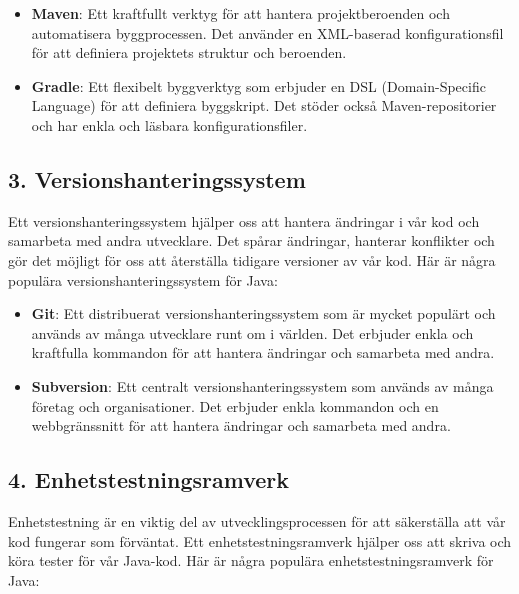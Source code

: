 \begin{itemize}
\tightlist
\item
  \textbf{Maven}: Ett kraftfullt verktyg för att hantera
  projektberoenden och automatisera byggprocessen. Det använder en
  XML-baserad konfigurationsfil för att definiera projektets struktur
  och beroenden.
\item
  \textbf{Gradle}: Ett flexibelt byggverktyg som erbjuder en DSL
  (Domain-Specific Language) för att definiera byggskript. Det stöder
  också Maven-repositorier och har enkla och läsbara
  konfigurationsfiler.
\end{itemize}

\hypertarget{versionshanteringssystem}{%
\subsection{3.
Versionshanteringssystem}\label{versionshanteringssystem}}

Ett versionshanteringssystem hjälper oss att hantera ändringar i vår kod
och samarbeta med andra utvecklare. Det spårar ändringar, hanterar
konflikter och gör det möjligt för oss att återställa tidigare versioner
av vår kod. Här är några populära versionshanteringssystem för Java:

\begin{itemize}
\tightlist
\item
  \textbf{Git}: Ett distribuerat versionshanteringssystem som är mycket
  populärt och används av många utvecklare runt om i världen. Det
  erbjuder enkla och kraftfulla kommandon för att hantera ändringar och
  samarbeta med andra.
\item
  \textbf{Subversion}: Ett centralt versionshanteringssystem som används
  av många företag och organisationer. Det erbjuder enkla kommandon och
  en webbgränssnitt för att hantera ändringar och samarbeta med andra.
\end{itemize}

\hypertarget{enhetstestningsramverk}{%
\subsection{4. Enhetstestningsramverk}\label{enhetstestningsramverk}}

Enhetstestning är en viktig del av utvecklingsprocessen för att
säkerställa att vår kod fungerar som förväntat. Ett
enhetstestningsramverk hjälper oss att skriva och köra tester för vår
Java-kod. Här är några populära enhetstestningsramverk för Java:

